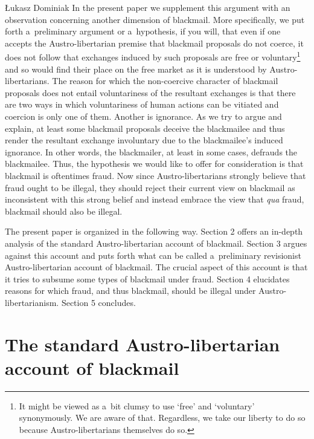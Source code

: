 \begin{artengenv}{Łukasz Dominiak}
In the present paper we supplement this argument with an observation concerning another dimension of blackmail. More specifically, we put forth a~preliminary argument or a~hypothesis, if you will, that even if one accepts the Austro-libertarian premise that blackmail proposals do not coerce, it does not follow that exchanges induced by such proposals are free or voluntary\footnote{It might be viewed as a~bit clumsy to use ‘free' and ‘voluntary' synonymously. We are aware of that. Regardless, we take our liberty to do so because Austro-libertarians themselves do so. } and so would find their place on the free market as it is understood by Austro-libertarians. The reason for which the non-coercive character of blackmail proposals does not entail voluntariness of the resultant exchanges is that there are two ways in which voluntariness of human actions can be vitiated and coercion is only one of them. Another is ignorance. As we try to argue and explain, at least some blackmail proposals deceive the blackmailee and thus render the resultant exchange involuntary due to the blackmailee's induced ignorance. In other words, the blackmailer, at least in some cases, defrauds the blackmailee. Thus, the hypothesis we would like to offer for consideration is that blackmail is oftentimes fraud. Now since Austro-libertarians strongly believe that fraud ought to be illegal, they should reject their current view on blackmail as inconsistent with this strong belief and instead embrace the view that \textit{qua} fraud, blackmail should also be illegal.



The present paper is organized in the following way. Section 2 offers an in-depth analysis of the standard Austro-libertarian account of blackmail. Section 3 argues against this account and puts forth what can be called a~preliminary revisionist Austro-libertarian account of blackmail. The crucial aspect of this account is that it tries to subsume some types of blackmail under fraud. Section 4 elucidates reasons for which fraud, and thus blackmail, should be illegal under Austro-libertarianism. Section 5 concludes.



\section{The standard Austro-libertarian account of blackmail}



\end{artengenv}
